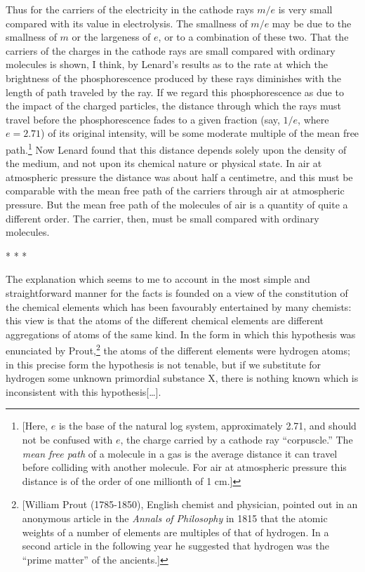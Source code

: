 Thus for the carriers of the electricity in the cathode rays $m/e$
is very small compared with its value in electrolysis. The smallness of
$m/e$ may be due to the smallness of $m$ or the largeness of
$e$, or to a combination of these two. That the carriers of the
charges in the cathode rays are small compared with ordinary molecules
is shown, I think, by Lenard's results as to the rate at which the
brightness of the phosphorescence produced by these rays diminishes with
the length of path traveled by the ray. If we regard this
phosphorescence as due to the impact of the charged particles, the
distance through which the rays must travel before the phosphorescence
fades to a given fraction (say, $1/e$, where $e = 2.71$)
of its original intensity, will be some moderate multiple of the mean
free path.\footnote{{[}Here, $e$ is the
  base of the natural log system, approximately 2.71, and should not be
  confused with $e$, the charge carried by a cathode ray
  ``corpuscle.'' The \emph{mean free path} of a molecule in a gas is the
  average distance it can travel before colliding with another molecule.
  For air at atmospheric pressure this distance is of the order of one
  millionth of 1 cm.{]}} Now Lenard found that this distance depends
solely upon the density of the medium, and not upon its chemical nature
or physical state. In air at atmospheric pressure the distance was about
half a centimetre, and this must be comparable with the mean free path
of the carriers through air at atmospheric pressure. But the mean free
path of the molecules of air is a quantity of quite a different order.
The carrier, then, must be small compared with ordinary molecules.\\
\centerline{* * *}

The explanation which seems to me to account in the most simple and
straight\-for\-ward manner for the facts is founded on a view of the
constitution of the chemical elements which has been favourably
entertained by many chemists: this view is that the atoms of the
different chemical elements are different aggregations of atoms of the
same kind. In the form in which this hypothesis was enunciated by
Prout,\footnote{{[}William Prout (1785-1850), English chemist and
  physician, pointed out in an anonymous article in the \emph{Annals of
  Philosophy} in 1815 that the atomic weights of a number of elements
  are multiples of that of hydrogen. In a second article in the
  following year he suggested that hydrogen was the ``prime matter'' of
  the ancients.{]}} the atoms of the different elements were hydrogen
atoms; in this precise form the hypothesis is not tenable, but if we
substitute for hydrogen some unknown primordial substance X, there is
nothing known which is inconsistent with this hypothesis[\ldots].

